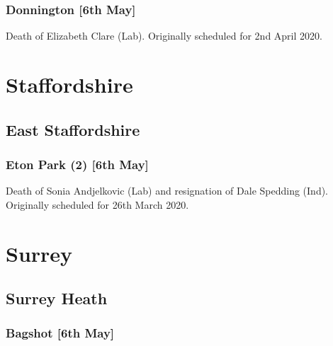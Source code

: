 \documentclass[a4paper,openany]{book}
\begin{document}
\begin{resultsiii}
\subsubsection*{Donnington \hspace*{\fill}\nolinebreak[1]%
	\enspace\hspace*{\fill}
	[6th May]}


Death of Elizabeth Clare (Lab).  Originally scheduled for 2nd April 2020.

\section{Staffordshire}

\subsection*{East Staffordshire}

\subsubsection*{Eton Park (2) \hspace*{\fill}\nolinebreak[1]%
	\enspace\hspace*{\fill}
	[6th May]}


Death of Sonia Andjelkovic (Lab) and resignation of Dale Spedding (Ind).  Originally scheduled for 26th March 2020.

\section{Surrey}

\subsection*{Surrey Heath}

\subsubsection*{Bagshot \hspace*{\fill}\nolinebreak[1]%
	\enspace\hspace*{\fill}
	[6th May]}


\end{resultsiii}
\end{document}
